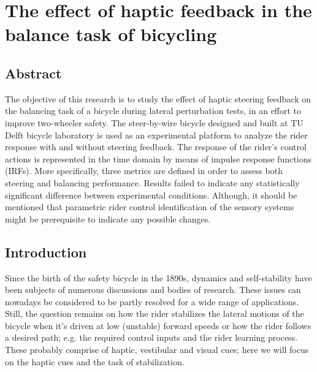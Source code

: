 \chapter{The effect of haptic feedback in the balance task of bicycling}\label{chapter2}




\section{Abstract}

The objective of this research is to study the effect of haptic steering feedback on the balancing task of a bicycle during lateral perturbation tests, in an effort to improve two-wheeler safety. The steer-by-wire bicycle designed and built at TU Delft bicycle laboratory is used as an experimental platform to analyze the rider response with and without steering feedback. The response of the rider's control actions is represented in the time domain by means of impulse response functions (IRFs). More specifically, three metrics are defined  in order to assess both steering and balancing performance. Results failed to indicate any statistically significant difference between experimental conditions. Although, it should be mentioned that parametric rider control identification of the  sensory systems might be prerequisite to indicate any possible changes.


\section{Introduction}

Since the birth of the safety bicycle in the 1890s, dynamics and self-stability have been subjects of numerous discussions and bodies of research. These issues can nowadays be considered to be partly resolved \cite{kooijman2011bicycle} for a wide range of applications. Still, the question remains on how the rider stabilizes the lateral motions of the bicycle when it's driven at low (unstable) forward speeds or how the rider follows a desired path; e.g. the required control inputs and the rider learning process. These probably comprise of haptic, vestibular and visual cues; here we will focus on the haptic cues and the task of stabilization. 

